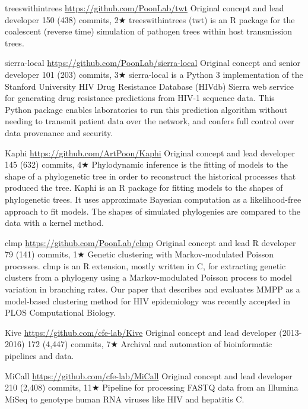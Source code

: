 {treeswithintrees}
{\url{https://github.com/PoonLab/twt}}
{Original concept and lead developer}
{150 (438) commits, 2$\bigstar$}
{treeswithintrees (twt) is an R package for the coalescent (reverse time) simulation of pathogen trees within host transmission trees.}


{sierra-local}
{\url{https://github.com/PoonLab/sierra-local}}
{Original concept and senior developer}
{101 (203) commits, 3$\bigstar$}
{sierra-local is a Python 3 implementation of the Stanford University HIV Drug Resistance Database (HIVdb) Sierra web service for generating drug resistance predictions from HIV-1 sequence data. This Python package enables laboratories to run this prediction algorithm without needing to transmit patient data over the network, and confers full control over data provenance and security.}


{Kaphi}
{\url{https://github.com/ArtPoon/Kaphi}}
{Original concept and lead developer}
{145 (632) commits, 4$\bigstar$}
{Phylodynamic inference is the fitting of models to the shape of a phylogenetic tree in order to reconstruct the historical processes that produced the tree.
Kaphi is an R package for fitting models to the shapes of phylogenetic trees.
It uses approximate Bayesian computation as a likelihood-free approach to fit models.
The shapes of simulated phylogenies are compared to the data with a kernel method.}



{clmp}
{\url{https://github.com/PoonLab/clmp}}
{Original concept and lead R developer}
{79 (141) commits, 1$\bigstar$}
{Genetic clustering with Markov-modulated Poisson processes. 
clmp is an R extension, mostly written in C, for extracting genetic clusters from a phylogeny using a Markov-modulated Poisson process to model variation in branching rates. Our paper that describes and evaluates MMPP as a model-based clustering method for HIV epidemiology was recently accepted in PLOS Computational Biology.
}


{Kive}
{\url{https://github.com/cfe-lab/Kive}}
{Original concept and lead developer (2013-2016)}
{172 (4,447) commits, 7$\bigstar$}
{Archival and automation of bioinformatic pipelines and data.}


{MiCall}
{\url{https://github.com/cfe-lab/MiCall}}
{Original concept and lead developer}
{210 (2,408) commits, 11$\bigstar$}
{Pipeline for processing FASTQ data from an Illumina MiSeq to genotype human RNA viruses like HIV and hepatitis C.}


